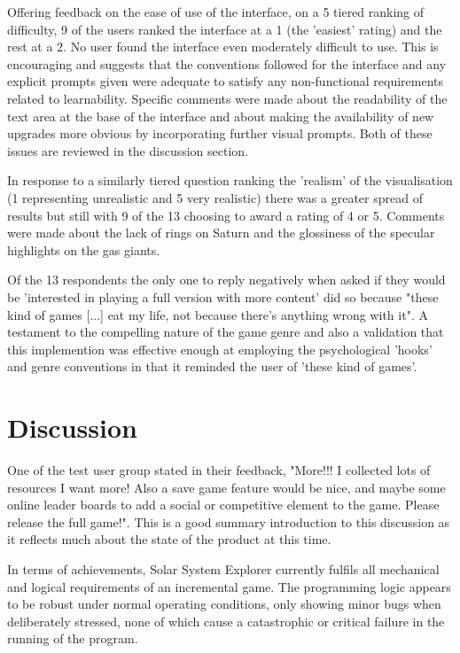 \documentclass[twoside]{bhamthesis}
\begin{document}
Offering feedback on the ease of use of the interface, on a 5 tiered ranking of difficulty, 9 of the users ranked the interface at a 1 (the 'easiest' rating) and the rest at a 2. No user found the interface even moderately difficult to use. This is encouraging and suggests that the conventions followed for the interface and any explicit prompts given were adequate to satisfy any non-functional requirements related to learnability. Specific comments were made about the readability of the text area at the base of the interface and about making the availability of new upgrades more obvious by incorporating further visual prompts. Both of these issues are reviewed in the discussion section.

In response to a similarly tiered question ranking the 'realism' of the visualisation (1 representing unrealistic and 5 very realistic) there was a greater spread of results but still with 9 of the 13 choosing to award a rating of 4 or 5. Comments were made about the lack of rings on Saturn and the glossiness of the specular highlights on the gas giants.

Of the 13 respondents the only one to reply negatively when asked if they would be 'interested in playing a full version with more content' did so because "these kind of games [...] eat my life, not because there's anything wrong with it". A testament to the compelling nature of the game genre and also a validation that this implemention was effective enough at employing the psychological 'hooks' and genre conventions in that it reminded the user of 'these kind of games'.

\section{Discussion}

One of the test user group stated in their feedback, "More!!! I collected lots of resources I want more! Also a save game feature would be nice, and maybe some online leader boards to add a social or competitive element to the game. Please release the full game!".  This is a good summary introduction to this discussion as it reflects much about the state of the product at this time.

In terms of achievements, Solar System Explorer currently fulfils all mechanical and logical requirements of an incremental game. The programming logic appears to be robust under normal operating conditions, only showing minor bugs when deliberately stressed, none of which cause a catastrophic or critical failure in the running of the program.
\end{document}
